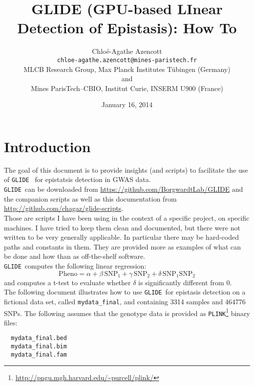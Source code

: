 \documentclass{article}
\title{GLIDE (GPU-based LInear Detection of Epistasis): How To}
\author{Chlo\'e-Agathe Azencott\\
  \texttt{chloe-agathe.azencott@mines-paristech.fr}\\
  MLCB Research Group,
  Max Planck Institutes T\"ubingen (Germany)\\
  and\\
  Mines ParisTech--CBIO, Institut Curie, INSERM U900 (France)}
\date{January 16, 2014}
\newcommand{\red}[1]{{\color{MyOrange}{\textbf{#1}}}}
\newcommand{\glide}{\texttt{GLIDE}}
\newcommand{\plink}{\texttt{PLINK}}
\begin{document}
\maketitle



\section{Introduction}
The goal of this document is to provide insights (and scripts) to facilitate the use of \glide~\cite{kamthong12} for epistatsis detection in GWAS data.\\

\glide\ can be downloaded from \url{https://github.com/BorgwardtLab/GLIDE} and the companion scripts as well as this documentation from \url{http://github.com/chagaz/glide-scripts}.\\

\red{Disclaimer:} Those are scripts I have been using in the context of a specific project, on specific machines. I have tried to keep them clean and documented, but there were not written to be very generally applicable. In particular there may be hard-coded paths and constants in them. They are provided more as examples of what can be done and how than as off-the-shelf software.\\

    \glide\ computes the following linear regression: 
    \[
    \mbox{Pheno} = \alpha + \beta\, \mbox{SNP}_1 + \gamma\, \mbox{SNP}_2 + \delta\, \mbox{SNP}_1 \mbox{SNP}_2
    \] and computes a t-test to evaluate whether $\delta$ is significantly different from $0$.\\

     The following document illustrates how to use \glide\ for epistasis detection on a fictional data set, called \texttt{mydata\_final}, and containing 3314 samples and 464776 SNPs.
The following assumes that the genotype data is provided as \plink\footnote{\url{http://pngu.mgh.harvard.edu/~purcell/plink/}} binary files: \\

\begin{verbatim}
  mydata_final.bed
  mydata_final.bim
  mydata_final.fam
\end{verbatim}
\end{document}
